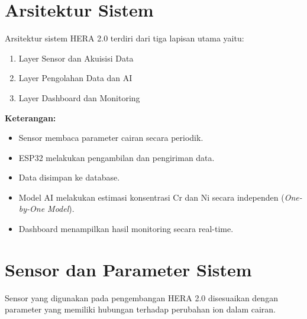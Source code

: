 \documentclass[12pt,a4paper]{article}
\begin{document}

\section{Arsitektur Sistem}

Arsitektur sistem HERA 2.0 terdiri dari tiga lapisan utama yaitu:

\begin{enumerate}
    \item Layer Sensor dan Akuisisi Data
    \item Layer Pengolahan Data dan AI
    \item Layer Dashboard dan Monitoring
\end{enumerate}

\textbf{Keterangan:}

\begin{itemize}
    \item Sensor membaca parameter cairan secara periodik.
    \item ESP32 melakukan pengambilan dan pengiriman data.
    \item Data disimpan ke database.
    \item Model AI melakukan estimasi konsentrasi Cr dan Ni secara independen (\textit{One-by-One Model}).
    \item Dashboard menampilkan hasil monitoring secara real-time.
\end{itemize}


\section{Sensor dan Parameter Sistem}

Sensor yang digunakan pada pengembangan HERA 2.0 disesuaikan dengan parameter yang memiliki hubungan terhadap perubahan ion dalam cairan.
\end{document}
